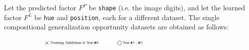 \begin{dataset}
\begin{figure}[H]
\begin{subfigure}[b]{0.45\textwidth}
\begin{subfigure}[b]{0.48\textwidth}
            \end{subfigure}
        \end{subfigure}
    \end{figure}
\end{dataset}

\begin{dataset}\label{def:1_cgo_experiments}
    Let the predicted factor $F^P$ be \texttt{shape} (i.e. the image digits), and let the 
    learned factor $F^L$ be \texttt{hue} and \texttt{position}, each for a different dataset. The 
    single compositional generalization opportunity datasets are obtained as follows:

    \begin{figure}[H]
        \centering
        \begin{subfigure}[b]{\textwidth}
            \centering
            \includegraphics[width=0.6\textwidth]{img/datasets/_legend.pdf}
        \end{subfigure}
        \vspace{-0.2cm} %


\end{figure}
\end{dataset}
